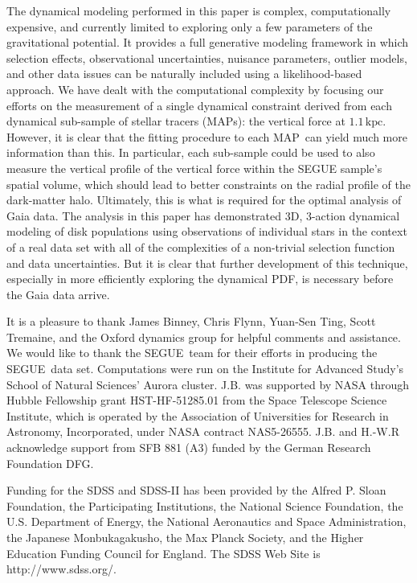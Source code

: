 \documentclass{emulateapj}
\newcommand{\segue}{SEGUE}
\newcommand{\map}{MAP}
\newcommand{\kpc}{\ensuremath{\,\mathrm{kpc}}}
\begin{document}
The dynamical modeling performed in this paper is complex,
computationally expensive, and currently limited to exploring only a
few parameters of the gravitational potential. It provides a full
generative modeling framework in which selection effects,
observational uncertainties, nuisance parameters, outlier models, and
other data issues can be naturally included using a likelihood-based
approach. We have dealt with the computational complexity by focusing
our efforts on the measurement of a single dynamical constraint
derived from each dynamical sub-sample of stellar tracers (\map s):
the vertical force at $1.1\kpc$. However, it is clear that the fitting
procedure to each \map\ can yield much more information than this.  In
particular, each sub-sample could be used to also measure the vertical
profile of the vertical force within the SEGUE sample's spatial
volume, which should lead to better constraints on the radial profile
of the dark-matter halo. Ultimately, this is what is required for the
optimal analysis of Gaia data. The analysis in this paper has
demonstrated 3D, 3-action dynamical modeling of disk populations using
observations of individual stars in the context of a real data set
with all of the complexities of a non-trivial selection function and
data uncertainties. But it is clear that further development of this
technique, especially in more efficiently exploring the dynamical PDF,
is necessary before the Gaia data arrive.




\acknowledgements It is a pleasure to thank James Binney, Chris Flynn,
Yuan-Sen Ting, Scott Tremaine, and the Oxford dynamics group for
helpful comments and assistance. We would like to thank the
\segue\ team for their efforts in producing the \segue\ data set.
Computations were run on the Institute for Advanced Study's School of
Natural Sciences' Aurora cluster. J.B. was supported by NASA through
Hubble Fellowship grant HST-HF-51285.01 from the Space Telescope
Science Institute, which is operated by the Association of
Universities for Research in Astronomy, Incorporated, under NASA
contract NAS5-26555. J.B. and H.-W.R acknowledge support from SFB 881
(A3) funded by the German Research Foundation DFG.

Funding for the SDSS and SDSS-II has been provided
by the Alfred P. Sloan Foundation, the Participating Institutions, the
National Science Foundation, the U.S. Department of Energy, the
National Aeronautics and Space Administration, the Japanese
Monbukagakusho, the Max Planck Society, and the Higher Education
Funding Council for England. The SDSS Web Site is
http://www.sdss.org/.
\end{document}
